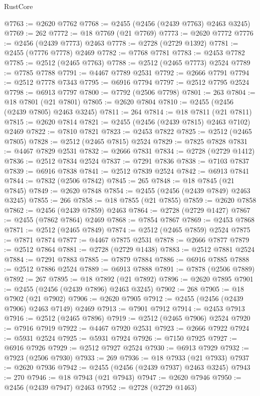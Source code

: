 \begin{lexlean}{RustCore}
\begin{coremodule}
@7763 := @2620 @7762
@7768 := @2455 (@2456 (@2439 @7763) @2463 @3245)
@7769 := 262
@7772 := @18 @7769 (@21 @7769)
@7773 := @2620 @7772
@7776 := @2456 (@2439 @7773) @2463
@7778 := @2728 (@2729 @1392)
@7781 := @2455 (@7776 @7778) @2469
@7782 := @7768 @7781
@7783 := @2453 @7782
@7785 := @2512 (@2465 @7763)
@7788 := @2512 (@2465 @7773) @2524
@7789 := @7785 @7788
@7791 := @4467 @7789 @2531
@7792 := @2666 @7791
@7794 := @2512 @7778 @7343
@7795 := @6916 @7794
@7797 := @2512 @7795 @2524
@7798 := @6913 @7797
@7800 := @7792 (@2506 @7798)
@7801 := 263
@7804 := @18 @7801 (@21 @7801)
@7805 := @2620 @7804
@7810 := @2455 (@2456 (@2439 @7805) @2463 @3245)
@7811 := 264
@7814 := @18 @7811 (@21 @7811)
@7815 := @2620 @7814
@7821 := @2455 (@2456 (@2439 @7815) @2463 @7102) @2469
@7822 := @7810 @7821
@7823 := @2453 @7822
@7825 := @2512 (@2465 @7805)
@7828 := @2512 (@2465 @7815) @2524
@7829 := @7825 @7828
@7831 := @4467 @7829 @2531
@7832 := @2666 @7831
@7834 := @2728 (@2729 @1412)
@7836 := @2512 @7834 @2524
@7837 := @7291 @7836
@7838 := @7103 @7837
@7839 := @6916 @7838
@7841 := @2512 @7839 @2524
@7842 := @6913 @7841
@7844 := @7832 (@2506 @7842)
@7845 := 265
@7848 := @18 @7845 (@21 @7845)
@7849 := @2620 @7848
@7854 := @2455 (@2456 (@2439 @7849) @2463 @3245)
@7855 := 266
@7858 := @18 @7855 (@21 @7855)
@7859 := @2620 @7858
@7862 := @2456 (@2439 @7859) @2463
@7864 := @2728 (@2729 @1427)
@7867 := @2455 (@7862 @7864) @2469
@7868 := @7854 @7867
@7869 := @2453 @7868
@7871 := @2512 (@2465 @7849)
@7874 := @2512 (@2465 @7859) @2524
@7875 := @7871 @7874
@7877 := @4467 @7875 @2531
@7878 := @2666 @7877
@7879 := @2512 @7864
@7881 := @2728 (@2729 @1438)
@7883 := @2512 @7881 @2524
@7884 := @7291 @7883
@7885 := @7879 @7884
@7886 := @6916 @7885
@7888 := @2512 @7886 @2524
@7889 := @6913 @7888
@7891 := @7878 (@2506 @7889)
@7892 := 267
@7895 := @18 @7892 (@21 @7892)
@7896 := @2620 @7895
@7901 := @2455 (@2456 (@2439 @7896) @2463 @3245)
@7902 := 268
@7905 := @18 @7902 (@21 @7902)
@7906 := @2620 @7905
@7912 := @2455 (@2456 (@2439 @7906) @2463 @7149) @2469
@7913 := @7901 @7912
@7914 := @2453 @7913
@7916 := @2512 (@2465 @7896)
@7919 := @2512 (@2465 @7906) @2524
@7920 := @7916 @7919
@7922 := @4467 @7920 @2531
@7923 := @2666 @7922
@7924 := @5931 @2524
@7925 := @5931 @7924
@7926 := @7150 @7925
@7927 := @6916 @7926
@7929 := @2512 @7927 @2524
@7930 := @6913 @7929
@7932 := @7923 (@2506 @7930)
@7933 := 269
@7936 := @18 @7933 (@21 @7933)
@7937 := @2620 @7936
@7942 := @2455 (@2456 (@2439 @7937) @2463 @3245)
@7943 := 270
@7946 := @18 @7943 (@21 @7943)
@7947 := @2620 @7946
@7950 := @2456 (@2439 @7947) @2463
@7952 := @2728 (@2729 @1463)

\end{coremodule}
\end{lexlean}

